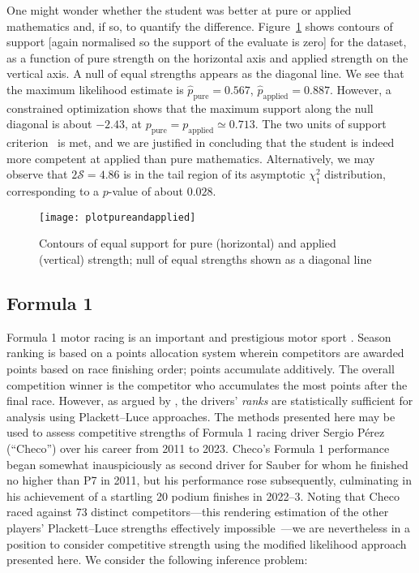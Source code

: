 \documentclass[article]{ajs}
\begin{document}
One might wonder whether the student was better at pure or applied
mathematics and, if so, to quantify the difference.
Figure~\ref{plotpureandapplied} shows contours of support [again
  normalised so the support of the evaluate is zero] for the dataset,
as a function of pure strength on the horizontal axis and applied
strength on the vertical axis.  A null of equal strengths appears as
the diagonal line.  We see that the maximum likelihood estimate is
$\hat{p}_\mathrm{pure}=0.567$, $\hat{p}_\mathrm{applied}=0.887$.
However, a constrained optimization shows that the maximum support
along the null diagonal is about $-2.43$, at
${p}_\mathrm{pure}={p}_\mathrm{applied}\simeq 0.713$.  The two units of
support criterion~\citep{edwards1972} is met, and we are justified in
concluding that the student is indeed more competent at applied than
pure mathematics.  Alternatively, we may observe that
$2\mathcal{S}=4.86$ is in the tail region of its asymptotic $\chi^2_1$
distribution, corresponding to a $p$-value of about $0.028$.

\begin{figure}
\begin{centering}
\texttt{[image: plotpureandapplied]}  %
\caption{Contours of equal support for pure (horizontal) and applied
  (vertical) strength; null of equal strengths shown as a diagonal
  line \label{plotpureandapplied}}
\end{centering}
\end{figure}


\subsection{Formula 1}

Formula 1 motor racing is an important and prestigious motor sport
\citep{codling2017,jenkins2010}.  Season ranking is based on a points
allocation system wherein competitors are awarded points based on race
finishing order; points accumulate additively.  The overall
competition winner is the competitor who accumulates the most points
after the final race.  However, as argued by
\cite{hankin2023_formula1points}, the drivers' {\em ranks} are
statistically sufficient for analysis using Plackett--Luce approaches.
The methods presented here may be used to assess competitive strengths
of Formula 1 racing driver Sergio P\'{e}rez (``Checo'') over his
career from 2011 to 2023.  Checo's Formula 1 performance began
somewhat inauspiciously as second driver for Sauber for whom he
finished no higher than P7 in 2011, but his performance rose
subsequently, culminating in his achievement of a startling 20 podium
finishes in 2022--3.  Noting that Checo raced against 73 distinct
competitors---this rendering estimation of the other players'
Plackett--Luce strengths effectively
impossible~\citep{hankin2020}---we are nevertheless in a position to
consider competitive strength using the modified likelihood approach
presented here.  We consider the following inference problem:
\end{document}
